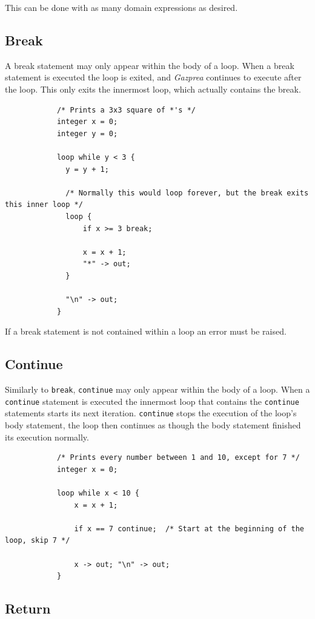 \documentclass{article}
\begin{document}
			This can be done with as many domain expressions as desired.


	\subsection{Break}\label{sec:break}

		A break statement may only appear within the body of a loop. When a break statement is executed the loop is
		exited, and \textit{Gazprea} continues to execute after the loop. This only exits the innermost loop, which
		actually contains the break.

		\begin{lstlisting}
			/* Prints a 3x3 square of *'s */
			integer x = 0;
			integer y = 0;

			loop while y < 3 {
			  y = y + 1;

			  /* Normally this would loop forever, but the break exits this inner loop */
			  loop {
				  if x >= 3 break;

				  x = x + 1;
				  "*" -> out;
			  }

			  "\n" -> out;
			}
		\end{lstlisting}

		If a break statement is not contained within a loop an error must be raised.

	\subsection{Continue}\label{sec:continue}


		Similarly to \texttt{break}, \texttt{continue} may only appear within the body of a loop. When a
		\texttt{continue} statement is executed the innermost loop that contains the \texttt{continue} statements starts
		its next iteration.  \texttt{continue} stops the execution of the loop's body statement, the loop then continues
		as though the body statement finished its execution normally.

		\begin{lstlisting}
			/* Prints every number between 1 and 10, except for 7 */
			integer x = 0;

			loop while x < 10 {
				x = x + 1;

				if x == 7 continue;  /* Start at the beginning of the loop, skip 7 */

				x -> out; "\n" -> out;
			}
		\end{lstlisting}


	\subsection{Return}\label{sec:return}
\end{document}
